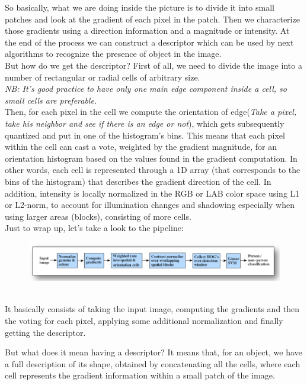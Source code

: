So basically, what we are doing inside the picture is to divide it into small patches and look at the gradient of each pixel in the patch.
Then we characterize those gradients using a direction information and a magnitude or intensity.
At the end of the process we can construct a descriptor which can be used by next algorithms to recognize the presence of object in the image.
\\But how do we get the descriptor?
First of all, we need to divide the image into a number of rectangular or radial cells of arbitrary size.
\\\textit{NB: It's good practice to have only one main edge component inside a cell, so small cells are preferable.} 
\\Then, for each pixel in the cell we compute the orientation of edge(\textit{Take a pixel, take his neighbor and see if there is an edge or not}), which gets subsequently quantized and put in one of the histogram's bins.
This means that each pixel within the cell can cast a vote, weighted by the gradient magnitude, for an orientation histogram based on the values found in the gradient computation.
In other words, each cell is represented through a 1D array (that corresponds to the bins of the histogram) that describes the gradient direction of the cell.
In addition, intensity is locally normalized in the RGB or LAB color space using L1 or L2-norm, to account for illumination changes and shadowing especially when using larger areas (blocks), consisting of more cells.
\\Just to wrap up, let's take a look to the pipeline:
\begin{figure}[h]
    \centering
    \includegraphics[scale=0.45]{Figures/HOG_Pipeline.png}
\end{figure}
\\It basically consists of taking the input image, computing the gradients and then the voting for each pixel, applying some additional normalization and finally getting the descriptor.

But what does it mean having a descriptor? It means that, for an object, we have a full description of its shape, obtained by concatenating all the cells, where each cell represents the gradient information within a small patch of the image.

